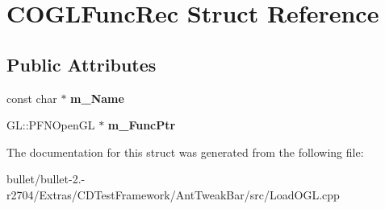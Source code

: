\hypertarget{struct_c_o_g_l_func_rec}{\section{C\+O\+G\+L\+Func\+Rec Struct Reference}
\label{struct_c_o_g_l_func_rec}
}
\subsection*{Public Attributes}
\begin{DoxyCompactItemize}
\item 
\hypertarget{struct_c_o_g_l_func_rec_a2713ad5f7d5c9915c1ee2e35081c3f5b}{const char $\ast$ {\bfseries m\+\_\+\+Name}}\label{struct_c_o_g_l_func_rec_a2713ad5f7d5c9915c1ee2e35081c3f5b}

\item 
\hypertarget{struct_c_o_g_l_func_rec_af1161a79c07c898352dca0b293e6cc49}{G\+L\+::\+P\+F\+N\+Open\+G\+L $\ast$ {\bfseries m\+\_\+\+Func\+Ptr}}\label{struct_c_o_g_l_func_rec_af1161a79c07c898352dca0b293e6cc49}

\end{DoxyCompactItemize}


The documentation for this struct was generated from the following file\+:\begin{DoxyCompactItemize}
\item 
bullet/bullet-\/2.-\/r2704/\+Extras/\+C\+D\+Test\+Framework/\+Ant\+Tweak\+Bar/src/Load\+O\+G\+L.\+cpp\end{DoxyCompactItemize}
